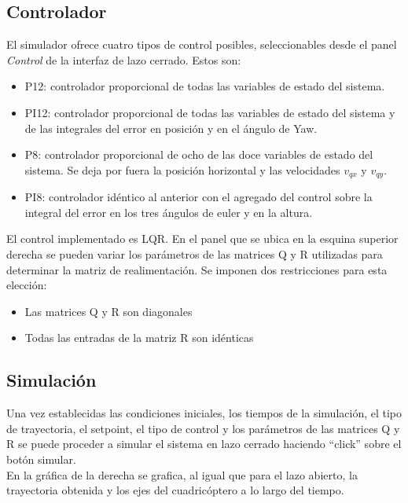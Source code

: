 \documentclass[main]{subfiles}
\begin{document}
\subsection*{Controlador}
El simulador ofrece cuatro tipos de control posibles, seleccionables desde el panel \emph{Control} de la interfaz de lazo cerrado. Estos son:
\begin{itemize}
\item P12: controlador proporcional de todas las variables de estado del sistema.
\item PI12: controlador proporcional de todas las variables de estado del sistema y de las integrales del error en posici\'on y en el \'angulo de Yaw.
\item P8: controlador proporcional de ocho de las doce variables de estado del sistema. Se deja por fuera la posici\'on horizontal y las velocidades $v_{qx}$ y $v_{qy}$.
\item PI8: controlador id\'entico al anterior con el agregado del control sobre la integral del error en los tres \'angulos de euler y en la altura.
\end{itemize}

El control implementado es LQR. En el panel que se ubica en la esquina superior derecha se pueden variar los par\'ametros de las matrices Q y R utilizadas para determinar la matriz de realimentaci\'on. Se imponen dos restricciones para esta elecci\'on:
\begin{itemize}
\item Las matrices Q y R son diagonales
\item Todas las entradas de la matriz R son id\'enticas
\end{itemize}

\subsection*{Simulaci\'on}
Una vez establecidas las condiciones iniciales, los tiempos de la simulaci\'on, el tipo de trayectoria, el setpoint, el tipo de control y los par\'ametros de las matrices Q y R se puede proceder a simular el sistema en lazo cerrado haciendo ``click'' sobre el bot\'on simular.\\

En la gr\'afica de la derecha se grafica, al igual que para el lazo abierto, la trayectoria obtenida y los ejes del cuadric\'optero a lo largo del tiempo.\\
\end{document}
